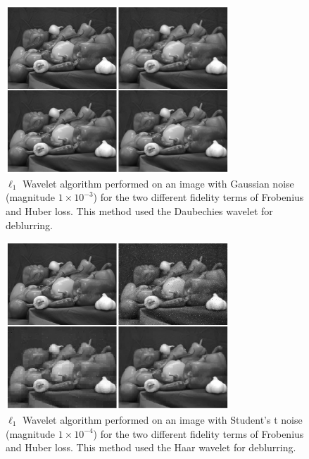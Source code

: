 \documentclass[10pt,a4paper]{article}
\begin{document}
\begin{figure}[H]
\begin{center}
\includegraphics[width = 0.75\textwidth]{../figures/waveletGaussD.pdf} 
\end{center}
\caption{$\ell_1$ Wavelet algorithm performed on an image with Gaussian noise (magnitude $1 \times 10^{-3}$) for the two different fidelity terms of Frobenius and Huber loss. This method used the Daubechies wavelet for deblurring.}
\label{waveletD_gauss}
\end{figure}

\begin{figure}[H]
\begin{center}
\includegraphics[width = 0.75\textwidth]{../figures/waveletStudentH.pdf} 
\end{center}
\caption{$\ell_1$ Wavelet algorithm performed on an image with Student's t noise (magnitude $1 \times 10^{-4}$) for the two different fidelity terms of Frobenius and Huber loss. This method used the Haar wavelet for deblurring.}
\label{waveletH_student}
\end{figure}
\end{document}
